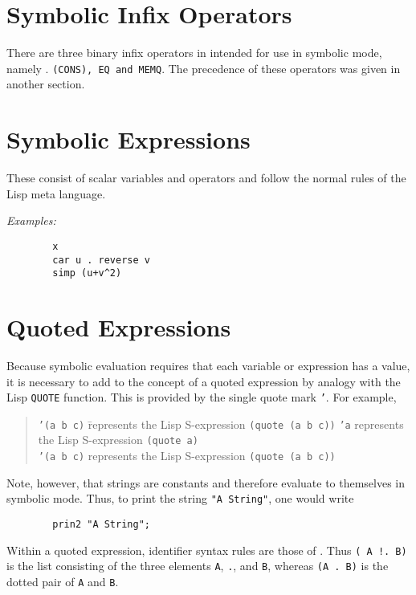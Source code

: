 \section{Symbolic Infix Operators}

There are three binary infix operators in {\REDUCE} intended for use in
symbolic mode, namely . {\tt (CONS), EQ and MEMQ}. The precedence of
these operators was given in another section.

\section{Symbolic Expressions}

These consist of scalar variables and operators and follow the normal
rules of the Lisp meta language.

{\it Examples:}
\begin{verbatim}
        x
        car u . reverse v
        simp (u+v^2)
\end{verbatim}

\section{Quoted Expressions}

Because symbolic evaluation requires that each variable or expression has a
value, it is necessary to add to {\REDUCE} the concept of a quoted expression
by analogy with the Lisp {\tt QUOTE} function. This is provided by the single
quote mark {\tt '}.  For example,
\begin{quote}
\begin{tabbing}
{\tt '(a b c)} \= represents the Lisp S-expression \= {\tt (quote (a b
c))}\kill
{\tt 'a} \> represents the Lisp S-expression \>
{\tt (quote a)} \\
{\tt '(a b c)} \> represents the Lisp S-expression \> {\tt (quote (a b c))}
\end{tabbing}
\end{quote}
Note, however, that strings are constants and therefore evaluate to
themselves in symbolic mode. Thus, to print the string {\tt "A String"}, one
would write
\begin{verbatim}
        prin2 "A String";
\end{verbatim}
Within a quoted expression, identifier syntax rules are those of {\REDUCE}.
Thus {\tt ( A !.  B)} is the list consisting of the three elements {\tt A},
{\tt .}, and {\tt B}, whereas {\tt (A .  B)} is the dotted pair of {\tt A}
and {\tt B}.

